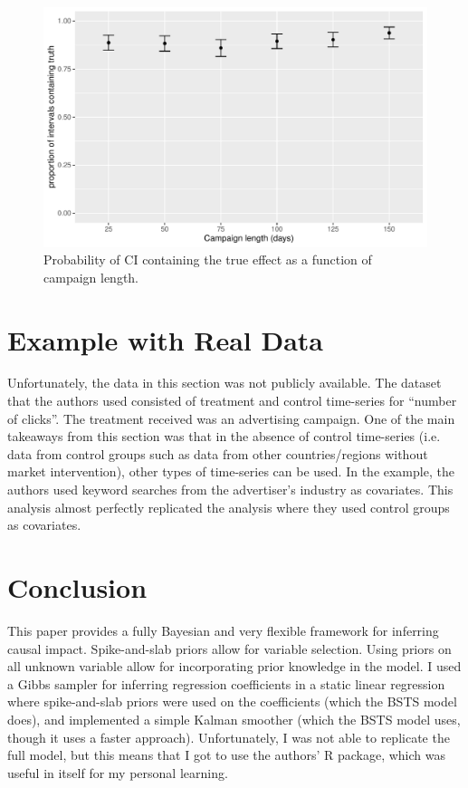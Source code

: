 \documentclass[12pt]{article}
\begin{document}
\begin{figure}[!h]
    \centering
    \includegraphics[scale=.6
    ]{../figures/newplot.pdf}
    \caption{Probability of CI containing the true effect as a function of campaign length.}
    \label{int}
\end{figure}
\newpage

\section{Example with Real Data }
Unfortunately, the data in this section was not publicly available. The dataset that the authors used consisted of treatment and control time-series for ``number of clicks''. The treatment received was an advertising campaign. One of the main takeaways from this section was that in the absence of control time-series (i.e. data from control groups such as data from other countries/regions without market intervention), other types of time-series can be used. In the example, the authors used keyword searches from the advertiser's industry as covariates. This analysis almost perfectly replicated the analysis where they used control groups as covariates.

\section{Conclusion}
This paper provides a fully Bayesian and very flexible framework for inferring causal impact. Spike-and-slab priors allow for variable selection. Using priors on all unknown variable allow for incorporating prior knowledge in the model. I used a Gibbs sampler for inferring regression coefficients in a static linear regression where spike-and-slab priors were used on the coefficients (which the BSTS model does), and implemented a simple Kalman smoother (which the BSTS model uses, though it uses a faster approach).
Unfortunately, I was not able to replicate the full model, but this means that I got to use the authors' R package, which was useful in itself for my personal learning. \\
\end{document}
